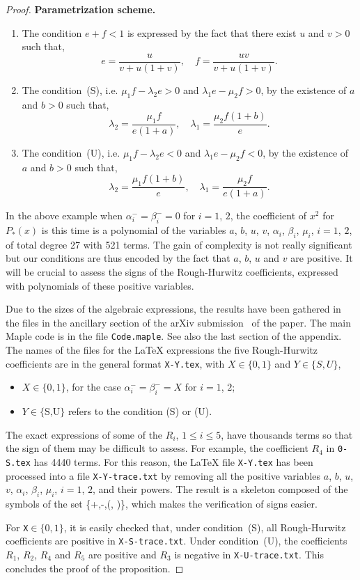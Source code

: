 \documentclass[english]{amsart}
\numberwithin{proposition}{section}
\begin{document}
\begin{proof}
\medskip
\noindent
{\bf Parametrization scheme.}
\begin{enumerate}
\item The condition $e{+}f{<}1$ is expressed by the fact that there exist $u$ and $v{>}0$ such that,
\[
e=\frac{u}{v+u(1+v)},\quad f=\frac{uv}{v+u(1+v)}.
\]
\item The condition~(S), i.e. $\mu_1f{-}\lambda_2e >0$ and $\lambda_1e{-}\mu_2f>0$, by the existence of $a$ and $b{>}0$ such that,
\[
\lambda_2=\frac{\mu_1f}{e(1+a)},\quad 
\lambda_1=\frac{\mu_2f(1+b)}{e}.
\]
\item The condition~(U), i.e. $\mu_1f{-}\lambda_2e <0$ and $\lambda_1e{-}\mu_2f<0$, by the existence of $a$ and $b{>}0$ such that,
\[
\lambda_2=\frac{\mu_1f(1{+}b) }{e},\quad 
\lambda_1=\frac{\mu_2 f}{e(1{+}a)}.
\]
\end{enumerate}
In the above example when $\alpha_i^-{=}\beta_i^-{=}0$ for $i{=}1$, $2$, the coefficient of $x^2$ for $P_*(x)$ is this time is a polynomial of the variables $a$, $b$, $u$, $v$, $\alpha_i$, $\beta_i$, $\mu_i$, $i{=}1$, $2$, of total degree 27 with 521 terms. The gain of complexity is not really  significant but our conditions are thus encoded by the fact that $a$, $b$, $u$ and $v$ are positive.  It will be crucial to assess the signs of the Rough-Hurwitz coefficients, expressed with polynomials of these positive variables.

Due to the sizes of the algebraic expressions, the results have been gathered in the files in the ancillary section of the arXiv submission~\citet{LR26} of the paper. The main Maple\texttrademark{} code is in the file {\tt Code.maple}. See also the last section of the appendix. The  names of the files for the \LaTeX{} expressions the five Rough-Hurwitz coefficients are in the general format {\tt X-Y.tex}, with $X{\in}\{0,1\}$ and $Y{\in}\{S,U\}$,
\begin{itemize}
\item $X{\in}\{0,1\}$, for the case $\alpha_i^-{=}\beta_i^-{=}X$ for $i{=}1$, $2$;
\item $Y{\in}\{\text{S,U}\}$ refers to the condition (S) or (U).
\end{itemize}
The exact expressions of some of the $R_i$, $1{\le}i{\le}5$, have thousands terms so that the sign of them may be  difficult to assess. For example, the coefficient $R_4$ in  {\tt 0-S.tex} has 4440 terms. For this reason, the \LaTeX{} file {\tt X-Y.tex} has been processed into a file {\tt X-Y-trace.txt} by removing all the positive variables  $a$, $b$, $u$, $v$, $\alpha_i$, $\beta_i$, $\mu_i$, $i{=}1$, $2$, and their powers. The result is a skeleton composed of the symbols of the set \{+,-,(, )\}, which makes the verification of signs easier.

For  {\tt X}${\in}\{0,1\}$, it is easily checked that, under condition~(S), all Rough-Hurwitz coefficients are positive in {\tt X-S-trace.txt}. Under condition~(U),  the coefficients $R_1$, $R_2$, $R_4$ and $R_5$ are positive and $R_3$ is negative  in {\tt X-U-trace.txt}. This concludes the proof of the proposition. 
\end{proof}
\end{document}
